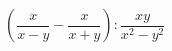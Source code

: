 \begin{ex}[type=calculate_expression]
	\begin{condition}
		\( \left( \dfrac{x}{x-y}-\dfrac{x}{x+y} \right):\dfrac{xy}{x^2-y^2} \)
	\end{condition}
\end{ex}